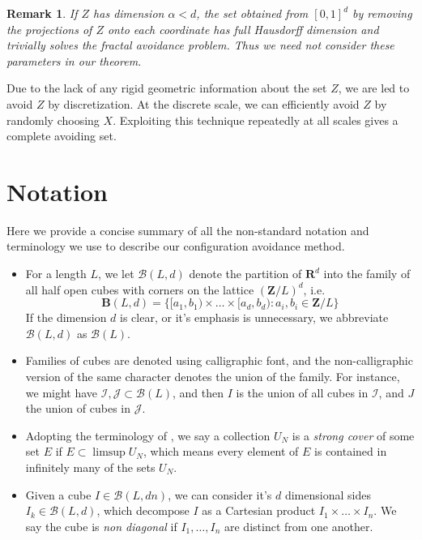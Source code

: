 \documentclass{article}
\theoremstyle{plain}
\theoremstyle{plain}
\newtheorem*{remark}{Remark}
\begin{document}
\begin{multicols}{2}
\begin{remark}
	If $Z$ has dimension $\alpha < d$, the set obtained from $[0,1]^d$ by removing the projections of $Z$ onto each coordinate has full Hausdorff dimension and trivially solves the fractal avoidance problem. Thus we need not consider these parameters in our theorem.
\end{remark}

Due to the lack of any rigid geometric information about the set $Z$, we are led to avoid $Z$ by discretization. At the discrete scale, we can efficiently avoid $Z$ by randomly choosing $X$. Exploiting this technique repeatedly at all scales gives a complete avoiding set.

\section{Notation}

Here we provide a concise summary of all the non-standard notation and terminology we use to describe our configuration avoidance method.

\begin{itemize}
	\item For a length $L$, we let $\mathcal{B}(L,d)$ denote the partition of $\mathbf{R}^d$ into the family of all half open cubes with corners on the lattice $(\mathbf{Z}/L)^d$, i.e.
%
\[ \mathbf{B}(L,d) = \{ [a_1,b_1) \times \dots \times [a_d, b_d) : a_i,b_i \in \mathbf{Z}/L \} \]
%
If the dimension $d$ is clear, or it's emphasis is unnecessary, we abbreviate $\mathcal{B}(L,d)$ as $\mathcal{B}(L)$. 

	\item Families of cubes are denoted using calligraphic font, and the non-calligraphic version of the same character denotes the union of the family. For instance, we might have $\mathcal{I}, \mathcal{J} \subset \mathcal{B}(L)$, and then $I$ is the union of all cubes in $\mathcal{I}$, and $J$ the union of cubes in $\mathcal{J}$.

	\item Adopting the terminology of \cite{KatzTao}, we say a collection $U_N$ is a {\it strong cover} of some set $E$ if $E \subset \limsup U_N$, which means every element of $E$ is contained in infinitely many of the sets $U_N$.

	\item Given a cube $I \in \mathcal{B}(L, dn)$, we can consider it's $d$ dimensional sides $I_k \in \mathcal{B}(L, d)$, which decompose $I$ as a Cartesian product $I_1 \times \dots \times I_n$. We say the cube is {\it non diagonal} if $I_1, \dots, I_n$ are distinct from one another.
\end{itemize}


\end{multicols}
\end{document}
